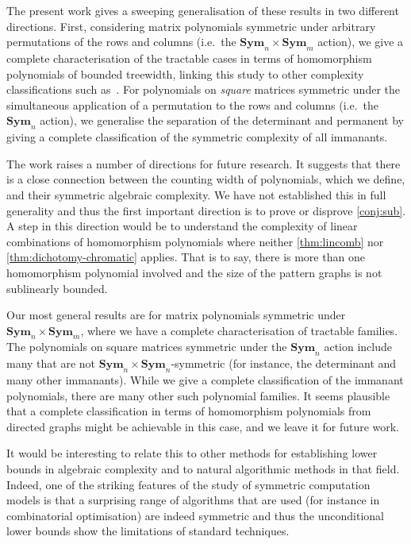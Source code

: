 \documentclass[11pt, DIV=15]{scrarticle}
\theoremstyle{definition}
\theoremstyle{plain}
\theoremstyle{remark}
\newcommand{\Sym}{\mathbf{Sym}}
\begin{document}
The present work gives a sweeping generalisation of these results in two different directions.  First, considering matrix polynomials symmetric under arbitrary permutations of the rows and columns (i.e.\ the $\Sym_n \times \Sym_m$ action), we give a complete characterisation of the tractable cases in terms of homomorphism polynomials of bounded treewidth, linking this study to other complexity classifications such as~\cite{curticapean_homomorphisms_2017}.  For polynomials on \emph{square} matrices symmetric under the simultaneous application of a permutation to the rows and columns (i.e.\ the $\Sym_n$ action), we generalise the separation of the determinant and permanent by giving a complete classification of the symmetric complexity of all immanants.

The work raises a number of directions for future research.  It suggests that there is a close connection between the counting width of polynomials, which we define, and their symmetric algebraic complexity. We have not established this in full generality and thus the first important direction is to prove or disprove \cref{conj:sub}. A step in this direction would be to understand the complexity of linear combinations of homomorphism polynomials where neither \cref{thm:lincomb} nor \cref{thm:dichotomy-chromatic} applies. 
That is to say, there is more than one homomorphism polynomial involved and the size of the pattern graphs is not sublinearly bounded.

Our most general results are for matrix polynomials symmetric under $\Sym_n \times \Sym_m$, where we have a complete characterisation of tractable families. The polynomials on square matrices symmetric under the $\Sym_n$ action include many that are not $\Sym_n \times \Sym_n$-symmetric (for instance, the determinant and many other immanants).  While we give a complete classification of the immanant polynomials, there are many other such polynomial families. It seems plausible that a complete classification in terms of homomorphism polynomials from directed graphs might be achievable in this case, and we leave it for future work.

It would be interesting to relate this to other methods for
establishing lower bounds in algebraic complexity and to natural
algorithmic methods in that field.  Indeed, one of the striking
features of the study of symmetric computation models is that a
surprising range of algorithms that are used (for instance in
combinatorial optimisation) are indeed symmetric and thus the
unconditional lower bounds show the limitations of standard
techniques.
\end{document}
